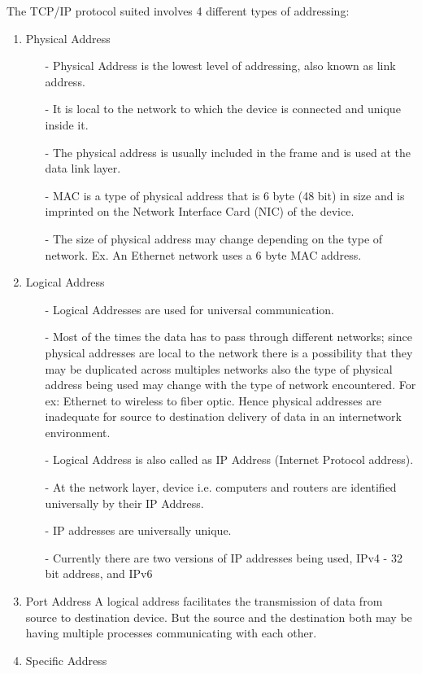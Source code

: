 \documentclass[a4paper,12pt]{report}
\begin{document}
The TCP/IP protocol suited involves 4 different types of addressing:
\begin{enumerate}
\item Physical Address
\begin{itemize}
\item[-] Physical Address is the lowest level of addressing, also known as link address.
\item[-]  It is local to the network to which the device is connected and unique inside it.
\item[-] The physical address is usually included in the frame and is used at the data link layer.
\item[-] MAC is a type of physical address that is 6 byte (48 bit) in size and is imprinted on the Network Interface Card (NIC) of the device.
\item[-] The size of physical address may change depending on the type of network. Ex. An Ethernet network uses a 6 byte MAC address.
\end{itemize}

\item Logical Address
\begin{itemize}
\item[-] Logical Addresses are used for universal communication.
\item[-] Most of the times the data has to pass through different networks; since physical addresses are local to the network there is a possibility that they may be duplicated across multiples networks also the type of physical address being used may change with the type of network encountered. For ex: Ethernet to wireless to fiber optic. Hence physical addresses are inadequate for source to destination delivery of data in an internetwork environment.
\item[-]  Logical Address is also called as IP Address (Internet Protocol address).
\item[-] At the network layer, device i.e. computers and routers are identified universally by their IP Address.
\item[-] IP addresses are universally unique.
\item[-] Currently there are two versions of IP addresses being used, IPv4 - 32 bit address, and IPv6
\end{itemize}


\item Port Address
A logical address facilitates the transmission of data from source to destination device. But the source and the destination both may be having multiple processes communicating with each other.

\item Specific Address
\end{enumerate}
\end{document}

